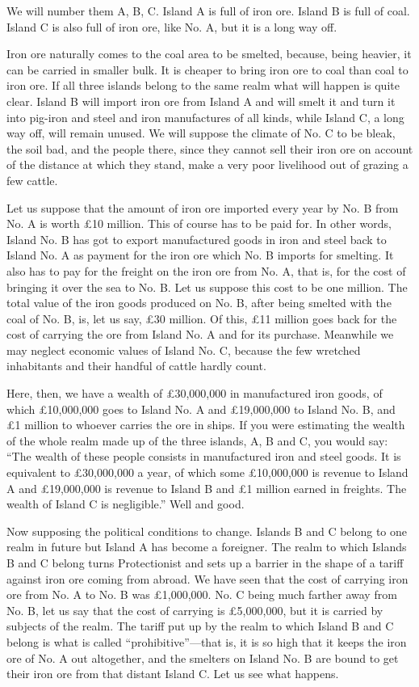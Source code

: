 \documentclass{book}
\begin{document}
We will number them A, B, C. Island A is full of iron ore. Island B is full of coal. Island C is also full of iron ore, like No. A, but it is a long way off.

Iron ore naturally comes to the coal area to be smelted, because, being heavier, it can be carried in smaller bulk. It is cheaper to bring iron ore to coal than coal to iron ore. If all three islands belong to the same realm what will happen is quite clear. Island B will import iron ore from Island A and will smelt it and turn it into pig-iron and steel and iron manufactures of all kinds, while Island C, a long way off, will remain unused. We will suppose the climate of No. C to be bleak, the soil bad, and the people there, since they cannot sell their iron ore on account of the distance at which they stand, make a very poor livelihood out of grazing a few cattle.

Let us suppose that the amount of iron ore imported every year by No. B from No. A is worth £10 million. This of course has to be paid for. In other words, Island No. B has got to export manufactured goods in iron and steel back to Island No. A as payment for the iron ore which No. B imports for smelting. It also has to pay for the freight on the iron ore from No. A, that is, for the cost of bringing it over the sea to No. B. Let us suppose this cost to be one million. The total value of the iron goods produced on No. B, after being smelted with the coal of No. B, is, let us say, £30 million. Of this, £11 million goes back for the cost of carrying the ore from Island No. A and for its purchase. Meanwhile we may neglect economic values of Island No. C, because the few wretched inhabitants and their handful of cattle hardly count.

Here, then, we have a wealth of £30,000,000 in manufactured iron goods, of which £10,000,000 goes to Island No. A and £19,000,000 to Island No. B, and £1 million to whoever carries the ore in ships. If you were estimating the wealth of the whole realm made up of the three islands, A, B and C, you would say: “The wealth of these people consists in manufactured iron and steel goods. It is equivalent to £30,000,000 a year, of which some £10,000,000 is revenue to Island A and £19,000,000 is revenue to Island B and £1 million earned in freights. The wealth of Island C is negligible.” Well and good.

Now supposing the political conditions to change. Islands B and C belong to one realm in future but Island A has become a foreigner. The realm to which Islands B and C belong turns Protectionist and sets up a barrier in the shape of a tariff against iron ore coming from abroad. We have seen that the cost of carrying iron ore from No. A to No. B was £1,000,000. No. C being much farther away from No. B, let us say that the cost of carrying is £5,000,000, but it is carried by subjects of the realm. The tariff put up by the realm to which Island B and C belong is what is called “prohibitive”—that is, it is so high that it keeps the iron ore of No. A out altogether, and the smelters on Island No. B are bound to get their iron ore from that distant Island C. Let us see what happens.
\end{document}
